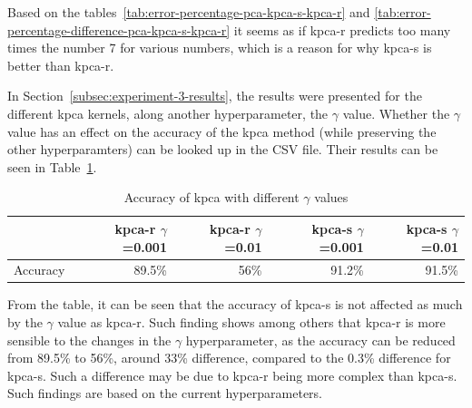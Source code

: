 Based on the tables~\ref{tab:error-percentage-pca-kpca-s-kpca-r} and \ref{tab:error-percentage-difference-pca-kpca-s-kpca-r} it seems as if \gls{kpca-r} predicts too many times the number 7 for various numbers, which is a reason for why \gls{kpca-s} is better than \gls{kpca-r}.


In Section~\ref{subsec:experiment-3-results}, the results were presented for the different \gls{kpca} kernels, along another hyperparameter, the $\gamma$ value. Whether the $\gamma$ value has an effect on the accuracy of the \gls{kpca} method (while preserving the other hyperparamters) can be looked up in the CSV file. Their results can be seen in Table~\ref{tab:gamma-values-kpca}.

\begin{table}[htb!]
    \centering
    \begin{tabular}{lrrrr}
        \toprule
          & kpca-r $\gamma$=0.001 & kpca-r $\gamma$=0.01 & kpca-s $\gamma$=0.001 & kpca-s $\gamma$=0.01 \\
        \midrule
        Accuracy & 89.5\% & 56\% & 91.2\% &  91.5\% \\
        \bottomrule
    \end{tabular}
    \caption{Accuracy of \gls{kpca} with different $\gamma$ values}
    \label{tab:gamma-values-kpca}
\end{table}

From the table, it can be seen that the accuracy of \gls{kpca-s} is not affected as much by the $\gamma$ value as \gls{kpca-r}. Such finding shows among others that \gls{kpca-r} is more sensible to the changes in the $\gamma$ hyperparameter, as the accuracy can be reduced from 89.5\% to 56\%, around 33\% difference, compared to the 0.3\% difference for \gls{kpca-s}. Such a difference may be due to \gls{kpca-r} being more complex than \gls{kpca-s}. Such findings are based on the current hyperparameters.